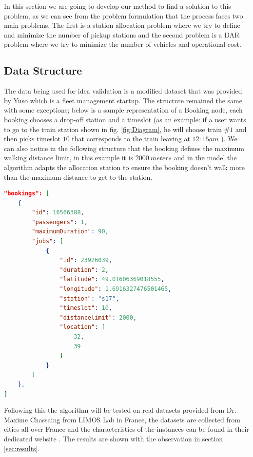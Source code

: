 \documentclass{article}
\begin{document}

In this section we are going to develop our method to find a solution to this problem, as we can see from the problem formulation that the process faces two main problems. The first is a station allocation problem where we try to define and minimize the number of pickup stations and the second problem is a DAR problem where we try to minimize the number of vehicles and operational cost.


\subsection{Data Structure}
\label{sec:data_struc}

The data being used for idea validation is a modified dataset that was provided by Yuso which is a fleet management startup. The structure remained the same with some exceptions; below is a sample representation of a Booking node, each booking chooses a drop-off station and a timeslot (as an example: if a user wants to go to the train station shown in fig. \ref{fig:Diagram}, he will choose train $\#1$ and then picks timeslot $10$ that corresponds to the train leaving at $12:15am$ ). We can also notice in the following structure that the booking defines the maximum walking distance limit, in this example it is $2000\  meters$ and in the model the algorithm adapts the allocation station to ensure the booking doesn't walk more than the maximum distance to get to the station. 
\begin{lstlisting}[language=json,firstnumber=1]
"bookings": [
    {
        "id": 16566388,
        "passengers": 1,
        "maximumDuration": 90,
        "jobs": [
            {
                "id": 23926039,
                "duration": 2,
                "latitude": 49.01606369018555,
                "longitude": 1.6916327476501465,
                "station": "s17",
                "timeslot": 10,
                "distancelimit": 2000,
                "location": [
                    32,
                    39
                ]
            }
        ]
    },
]
\end{lstlisting}

Following this the algorithm will be tested on real datasets provided from Dr. Maxime Chassaing from LIMOS Lab in France, the datasets are collected from cities all over France and the characteristics of the instances can be found in their dedicated website \cite{darp_instances}. The results are shown with the observation in section \ref{sec:results}.
\end{document}
